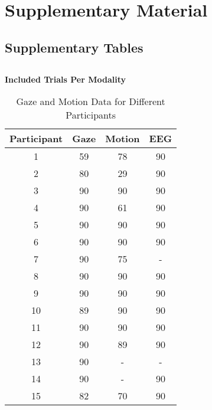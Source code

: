 
\section*{Supplementary Material}

\captionsetup[table]{labelfont=bf,labelformat=simple,labelsep=space,name=Supplementary Table}
\captionsetup[figure]{labelfont=bf,labelformat=simple,labelsep=space,name=Supplementary Figure}

\subsection*{Supplementary Tables}

\subsection*{}
\textbf{Included Trials Per Modality}
\begin{table}[h]
    \centering
    \caption{Gaze and Motion Data for Different Participants}
    \begin{tabular}{cccc}
        \toprule
        \textbf{Participant} & \textbf{Gaze} & \textbf{Motion} & \textbf{EEG}\\
        \midrule
        1  & 59 & 78 & 90 \\
        \midrule
        2  & 80 & 29 & 90 \\
        \midrule
        3  & 90 & 90 & 90 \\
        \midrule
        4  & 90 & 61 & 90\\
        \midrule
        5  & 90 & 90 & 90 \\
        \midrule
        6  & 90 & 90 & 90\\
        \midrule
        7  & 90 & 75 & -\\
        \midrule
        8  & 90 & 90 & 90\\
        \midrule
        9  & 90 & 90 & 90\\
        \midrule
        10 & 89 & 90 & 90\\
        \midrule
        11 & 90 & 90 & 90\\
        \midrule
        12 & 90 & 89 & 90\\
        \midrule
        13 & 90 & - & -\\
        \midrule
        14 & 90 & - & 90\\
        \midrule
        15 & 82 & 70 & 90 \\
        \hline
    \end{tabular}
    \label{table:gaze_motion_eeg data}
\end{table}

